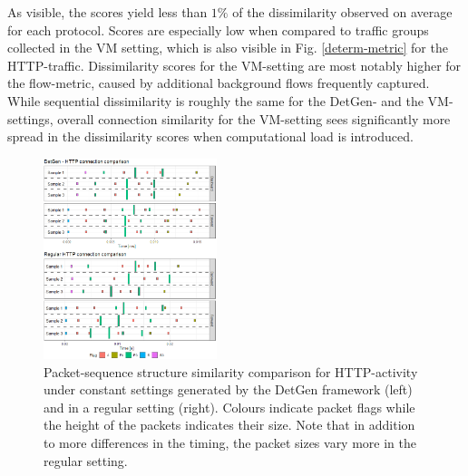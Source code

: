 \documentclass[runningheads]{llncs}
\begin{document}
As visible, the scores yield less than $1\%$ of the dissimilarity observed on average for each protocol. Scores are especially low when compared to traffic groups collected in the VM setting, which is also visible in Fig. \ref{determ-metric} for the HTTP-traffic. Dissimilarity scores for the VM-setting are most notably higher for the flow-metric, caused by additional background flows frequently captured. While sequential dissimilarity is roughly the same for the DetGen- and the VM-settings, overall connection similarity for the VM-setting sees significantly more spread in the dissimilarity scores when computational load is introduced.





\begin{figure}
\centering
\includegraphics[width=0.45\textwidth]{images/HTTP_comp_crop.png}
\caption{Packet-sequence structure similarity comparison for HTTP-activity under constant settings generated by the DetGen framework (left) and in a regular setting (right). Colours indicate packet flags while the height of the packets indicates their size. Note that in addition to more differences in the timing, the packet sizes vary more in the regular setting. }
\end{figure}
\end{document}
